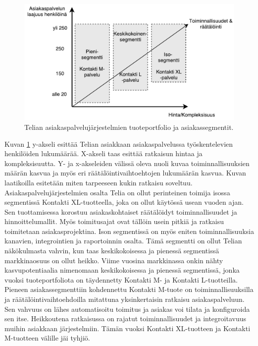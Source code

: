 \documentclass[finnish,12pt,a4paper,pdftex]{article}
\begin{document}
\begin{figure}[!h]
    \centering
    \includegraphics[scale=0.6]{images/segmentit.pdf}
    \caption{Telian asiakaspalvelujärjestelmien tuoteportfolio ja asiakassegmentit.}
    \label{fig:segmentit}
\end{figure}

Kuvan \ref{fig:segmentit} y-akseli esittää Telian asiakkaan asiakaspalvelussa työskentelevien henkilöiden lukumäärää. X-akseli taas esittää ratkaisun hintaa ja kompleksisuutta. Y- ja x-akseleiden välissä oleva nuoli kuvaa toiminnallisuuksien määrän kasvua ja myös eri räätälöintivaihtoehtojen lukumäärän kasvua. Kuvan laatikoilla esitetään miten tarpeeseen kukin ratkaisu soveltuu.\\

Asiakaspalvelujärjestelmien osalta Telia on ollut perinteinen toimija isossa segmentissä Kontakti XL-tuotteella, joka on ollut käytössä usean vuoden ajan. Sen tuottamisessa korostuu asiakaskohtaiset räätälöidyt toiminnallisuudet ja hinnoittelumallit. Myös toimitusajat ovat tällöin usein pitkiä ja ratkaisu toimitetaan asiakasprojektina. Ison segmentissä on myös eniten toiminnallisuuksia kanavien, integrointien ja raportoinnin osalta. Tämä segmentti on ollut Telian näkökulmasta vahvin, kun taas keskikokoisessa ja pienessä segmentissä markkinaosuus on ollut heikko. Viime vuosina markkinassa onkin nähty kasvupotentiaalia nimenomaan keskikokoisessa ja pienessä segmentissä, jonka vuoksi tuoteportfoliota on täydennetty Kontakti M- ja Kontakti L-tuotteilla.\\

Pieneen asiakassegmenttiin kohdennettu Kontakti M-tuote on toiminnallisuuksilla ja räätälöintivaihtoehdoilla mitattuna yksinkertaisin ratkaisu asiakaspalveluun. Sen vahvuus on lähes automatisoitu toimitus ja asiakas voi tilata ja konfiguroida sen itse. Heikkoutena ratkaisussa on rajatut toiminnallisuudet ja integroitavuus muihin asiakkaan järjestelmiin. Tämän vuoksi Kontakti XL-tuotteen ja Kontakti M-tuotteen välille jäi tyhjiö.\\
\end{document}
